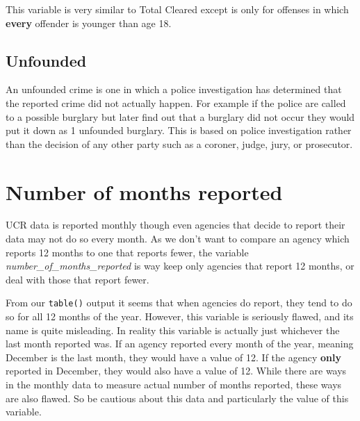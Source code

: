 \documentclass[
  12pt,
]{book}
\newenvironment{Shaded}{\begin{snugshade}}{\end{snugshade}}
\newcommand{\CommentTok}[1]{\textcolor[rgb]{0.56,0.35,0.01}{\textit{#1}}}
\newcommand{\DecValTok}[1]{\textcolor[rgb]{0.00,0.00,0.81}{#1}}
\newcommand{\KeywordTok}[1]{\textcolor[rgb]{0.13,0.29,0.53}{\textbf{#1}}}
\newcommand{\NormalTok}[1]{#1}
\newcommand{\OperatorTok}[1]{\textcolor[rgb]{0.81,0.36,0.00}{\textbf{#1}}}
\begin{document}
This variable is very similar to Total Cleared except is only for offenses in which \textbf{every} offender is younger than age 18.

\hypertarget{unfounded}{%
\subsection{Unfounded}\label{unfounded}}

An unfounded crime is one in which a police investigation has determined that the reported crime did not actually happen. For example if the police are called to a possible burglary but later find out that a burglary did not occur they would put it down as 1 unfounded burglary. This is based on police investigation rather than the decision of any other party such as a coroner, judge, jury, or prosecutor.

\hypertarget{number-of-months-reported}{%
\section{Number of months reported}\label{number-of-months-reported}}

UCR data is reported monthly though even agencies that decide to report their data may not do so every month. As we don't want to compare an agency which reports 12 months to one that reports fewer, the variable \emph{number\_of\_months\_reported} is way keep only agencies that report 12 months, or deal with those that report fewer.

\begin{Shaded}
\end{Shaded}

From our \texttt{table()} output it seems that when agencies do report, they tend to do so for all 12 months of the year. However, this variable is seriously flawed, and its name is quite misleading. In reality this variable is actually just whichever the last month reported was. If an agency reported every month of the year, meaning December is the last month, they would have a value of 12. If the agency \textbf{only} reported in December, they would also have a value of 12. While there are ways in the monthly data to measure actual number of months reported, these ways are also flawed. So be cautious about this data and particularly the value of this variable.
\end{document}
